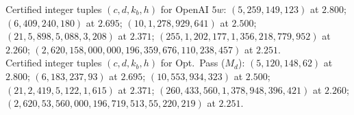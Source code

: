 \documentclass[11pt,a4paper]{article}
\theoremstyle{plain}
\theoremstyle{definition}
\theoremstyle{remark}
\begin{document}
\begin{landscape}
\begin{table}[!htbp]
\begin{tabular}{@{} l c c c l l @{}}
\bottomrule
\end{tabular}
\par\vspace{4pt}
{\scriptsize\raggedright
Certified integer tuples $(c, d, k_b, h)$ for OpenAI $5w$: $(5, 259, 149, 123)$ at $2.800$; $(6, 409, 240, 180)$ at $2.695$; $(10, 1{,}278, 929, 641)$ at $2.500$; $(21, 5{,}898, 5{,}088, 3{,}208)$ at $2.371$; $(255, 1{,}202{,}177, 1{,}356{,}218, 779{,}952)$ at $2.260$; $(2{,}620, 158{,}000{,}000, 196{,}359{,}676, 110{,}238{,}457)$ at $2.251$.\\
Certified integer tuples $(c, d, k_b, h)$ for Opt.\ Pass ($M_d$): $(5, 120, 148, 62)$ at $2.800$; $(6, 183, 237, 93)$ at $2.695$; $(10, 553, 934, 323)$ at $2.500$; $(21, 2{,}419, 5{,}122, 1{,}615)$ at $2.371$; $(260, 433{,}560, 1{,}378{,}948, 396{,}421)$ at $2.260$; $(2{,}620, 53{,}560{,}000, 196{,}719{,}513, 55{,}220{,}219)$ at $2.251$.\par}
\end{table}

\clearpage


\end{landscape}
\end{document}
